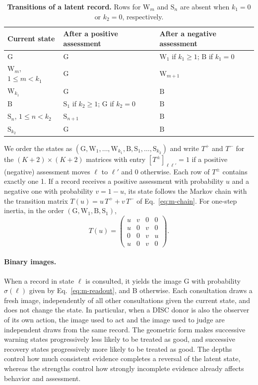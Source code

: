 \documentclass[10pt]{wlscirep}
\newcommand{\st}[1]{\mathrm{#1}}           %
\theoremstyle{plain}
\theoremstyle{remark}
\begin{document}
\begin{table}[!htbp]
\centering
\caption{\textbf{Transitions of a latent record.} Rows for $\st W_m$ and $\st S_n$ are absent when $k_1=0$ or $k_2=0$, respectively.}
\label{tab:si-transitions}
\small
\begin{tabular}{@{}lll@{}}
\toprule
Current state & After a positive assessment & After a negative assessment\\
\midrule
$\st G$ & $\st G$ & $\st W_1$ if $k_1\geq1$; $\st B$ if $k_1=0$\\
$\st W_m$, $1\leq m<k_1$ & $\st G$ & $\st W_{m+1}$\\
$\st W_{k_1}$ & $\st G$ & $\st B$\\
$\st B$ & $\st S_1$ if $k_2\geq1$; $\st G$ if $k_2=0$ & $\st B$\\
$\st S_n$, $1\leq n<k_2$ & $\st S_{n+1}$ & $\st B$\\
$\st S_{k_2}$ & $\st G$ & $\st B$\\
\bottomrule
\end{tabular}
\end{table}

We order the states as $(\st G,\st W_1,\ldots,\st W_{k_1},\st B,\st S_1,\ldots,\st S_{k_2})$ and write $T^+$ and $T^-$ for the $(K+2)\times(K+2)$ matrices with entry $[T^\pm]_{\ell\ell'}=1$ if a positive (negative) assessment moves $\ell$ to $\ell'$ and 0 otherwise. Each row of $T^\pm$ contains exactly one 1. If a record receives a positive assessment with probability $u$ and a negative one with probability $v=1-u$, its state follows the Markov chain with the transition matrix $T(u)=u\,T^++v\,T^-$ of Eq.~\eqref{eq:m-chain}. For one-step inertia, in the order $(\st G,\st W_1,\st B,\st S_1)$,
\begin{equation}
T(u)=\begin{pmatrix}u&v&0&0\\u&0&v&0\\0&0&v&u\\u&0&v&0\end{pmatrix}.
\label{eq:s-transition}
\end{equation}

\paragraph{Binary images.} When a record in state $\ell$ is consulted, it yields the image G with probability $\sigma(\ell)$ given by Eq.~\eqref{eq:m-readout}, and B otherwise. Each consultation draws a fresh image, independently of all other consultations given the current state, and does not change the state. In particular, when a DISC donor is also the observer of its own action, the image used to act and the image used to judge are independent draws from the same record. The geometric form makes successive warning states progressively less likely to be treated as good, and successive recovery states progressively more likely to be treated as good. The depths control how much consistent evidence completes a reversal of the latent state, whereas the strengths control how strongly incomplete evidence already affects behavior and assessment.
\end{document}
